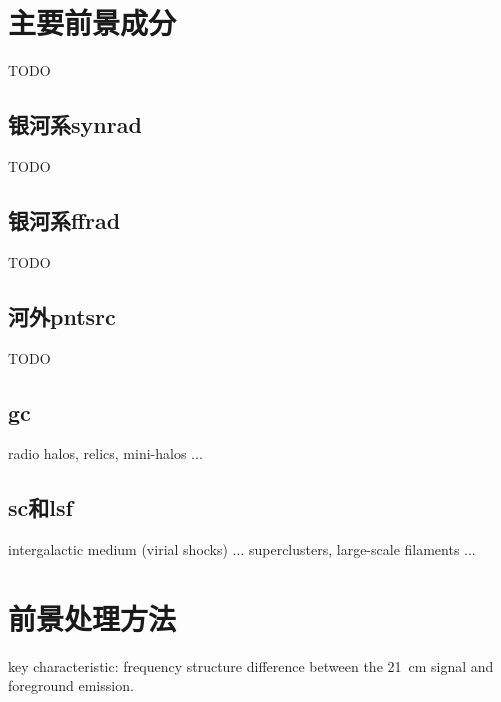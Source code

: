 \section{主要前景成分}

TODO

\subsection{银河系\acl*{synrad}}  %

TODO

\subsection{银河系\acl*{ffrad}}  %

TODO

\subsection{河外\acl*{pntsrc}}  %

TODO

\subsection{\acl*{gc}}  %

radio halos, relics, mini-halos ...

\subsection{\acl*{sc}和\acl*{lsf}}  %

intergalactic medium (virial shocks) ...
superclusters, large-scale filaments ...


\section{前景处理方法}

key characteristic: frequency structure difference between
the 21~cm signal and foreground emission.

